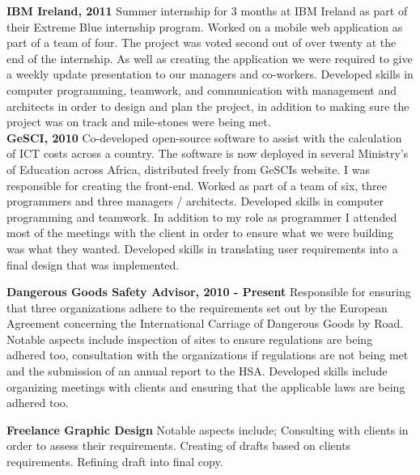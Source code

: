 \documentclass{res}
\begin{document}
\begin{resume}
    {\bf IBM Ireland, 2011 }Summer internship for 3 months at IBM Ireland as part of their Extreme Blue internship program. Worked on a mobile web application as part of a team of four. The project was voted second out of over twenty at the end of the internship. As well as creating the application we were required to give a weekly update presentation to our managers and co-workers. Developed skills in computer programming, teamwork, and communication with management and architects in order to design and plan the project, in addition to making sure the project was on track and mile-stones were being met.\\
    
 
    {\bf GeSCI, 2010} Co-developed open-source software to assist with the calculation of ICT costs across a country. The software is now deployed in several Ministry's of Education across Africa, distributed freely from GeSCIs website. I was responsible for creating the front-end. Worked as part of a team of six, three programmers and three managers / architects. Developed skills in computer programming and teamwork. In addition to my role as programmer I attended most of the meetings with the client in order to ensure what we were building was what they wanted. Developed skills in translating user requirements into a final design that was implemented.

    {\bf Dangerous Goods Safety Advisor, 2010 - Present} Responsible for ensuring that three organizations adhere to the requirements set out by the European Agreement concerning the International Carriage of Dangerous Goods by Road. Notable aspects include inspection of sites to ensure regulations are being adhered too, consultation with the organizations if regulations are not being met and the submission of an annual report to the HSA. Developed skills include organizing meetings with clients and ensuring that the applicable laws are being adhered too. 
 
    {\bf Freelance Graphic Design} Notable aspects include; Consulting with clients in order to assess their requirements. Creating of drafts based on clients requirements. Refining draft into final copy.
 
    
 


     

\end{resume}
\end{document}

